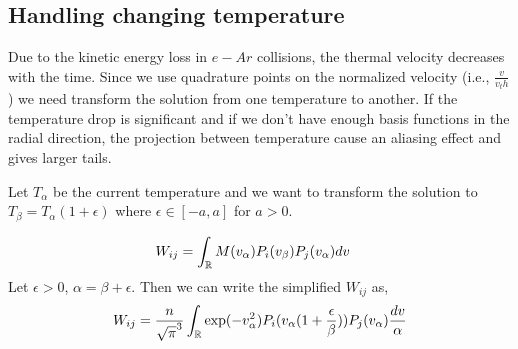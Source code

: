 \documentclass{article}[draft]
\begin{document}
\subsection{Handling changing temperature}
Due to the kinetic energy loss in $e-Ar$ collisions, the thermal velocity decreases with the time. Since we use quadrature points on the normalized velocity (i.e., $\frac{v}{v_th}$) we need transform the solution from one temperature to another. If the temperature drop is significant and if we don't have enough basis functions in the radial direction, the projection between temperature cause an aliasing effect and gives larger tails. 

Let $T_\alpha$ be the current temperature and we want to transform the solution to $T_\beta=T_\alpha (1+ \epsilon)$ where $\epsilon \in [-a,a]$ for $a>0$.

\begin{align}
W_{ij} &= \int_{\mathbb{R}} M(v_\alpha) P_i(v_\beta) P_j(v_\alpha)dv \label{eq:basis_change}
\end{align}
Let $\epsilon >0$, $\alpha = \beta + \epsilon$. Then we can write the simplified $W_{ij}$ as, 
\begin{align}
W_{ij} &= \frac{n}{\sqrt{\pi}^{3}}  \int_{\mathbb{R}}  \exp(-v_\alpha^2) P_i (v_\alpha (1 + \frac{\epsilon}{\beta})) P_j(v_\alpha) \frac{dv}{\alpha} \\
\end{align}
\end{document}
